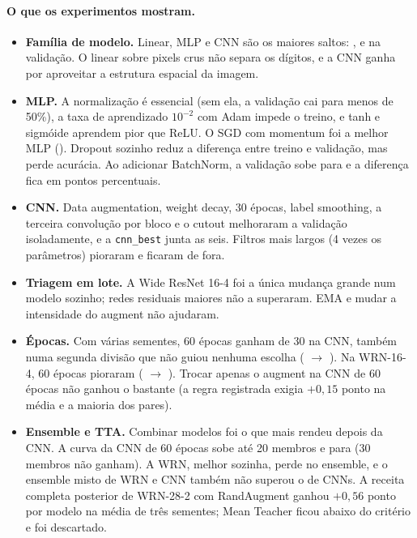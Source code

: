 \documentclass[11pt,a4paper]{article}
\begin{document}
\paragraph{O que os experimentos mostram.}
\begin{itemize}
  \item \textbf{Família de modelo.} Linear, MLP e CNN são os maiores saltos: \valLinear{}, \valMlp{} e \valCnn{}
        na validação. O linear sobre pixels crus não separa os dígitos, e a CNN ganha por aproveitar a estrutura
        espacial da imagem.
  \item \textbf{MLP.} A normalização é essencial (sem ela, a validação cai para menos de 50\%), a taxa de
        aprendizado $10^{-2}$ com Adam impede o treino, e tanh e sigmóide aprendem pior que ReLU. O SGD com
        momentum foi a melhor MLP (\valMlpMelhor{}). Dropout sozinho reduz a diferença entre treino e validação,
        mas perde acurácia. Ao adicionar BatchNorm, a validação sobe para \valMlpBnDropout{} e a diferença
        fica em \difMlpBnDropout{} pontos percentuais.
  \item \textbf{CNN.} Data augmentation, weight decay, 30 épocas, label smoothing, a terceira convolução por bloco
        e o cutout melhoraram a validação isoladamente, e a \texttt{cnn\_best} junta as seis. Filtros mais largos
        (4 vezes os parâmetros) pioraram e ficaram de fora.
  \item \textbf{Triagem em lote.} A Wide ResNet 16-4 foi a única mudança grande num modelo sozinho; redes residuais
        maiores não a superaram. EMA e mudar a intensidade do augment não ajudaram.
  \item \textbf{Épocas.} Com várias sementes, 60 épocas ganham de 30 na CNN, também numa segunda divisão que não
        guiou nenhuma escolha (\valCftrinta{} $\to$ \valCfsessenta{}). Na WRN-16-4, 60 épocas pioraram
        (\valWtrinta{} $\to$ \valWsessenta{}). Trocar apenas o augment na CNN de 60 épocas não
        ganhou o bastante (a regra registrada exigia $+0{,}15$ ponto na média e a maioria dos pares).
  \item \textbf{Ensemble e TTA.} Combinar modelos foi o que mais rendeu depois da CNN. A curva da CNN de 60 épocas
        sobe até 20 membros e para (30 membros não ganham). A WRN, melhor sozinha, perde no ensemble, e o ensemble
        misto de WRN e CNN também não superou o de CNNs. A receita completa posterior de WRN-28-2
        com RandAugment ganhou $+0{,}56$ ponto por modelo na média de três sementes; Mean Teacher
        ficou abaixo do critério e foi descartado.
\end{itemize}
\end{document}
